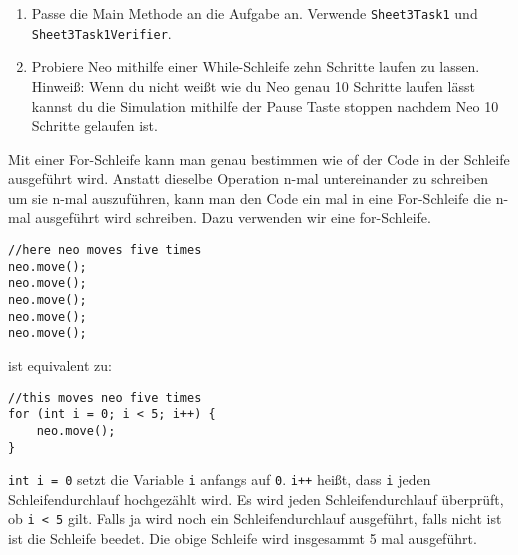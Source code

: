 
\begin{enumerate}
	\item Passe die Main Methode an die Aufgabe an. 
		Verwende \lstinline{Sheet3Task1} und \lstinline{Sheet3Task1Verifier}.
	\item
	Probiere Neo mithilfe einer While-Schleife zehn Schritte laufen zu lassen.\\
	Hinweiß: Wenn du nicht weißt wie du Neo genau 10 Schritte laufen lässt kannst du die Simulation mithilfe der Pause Taste stoppen nachdem Neo 10 Schritte gelaufen ist.
\end{enumerate}


\begin{Infobox}
	Mit einer For-Schleife kann man genau bestimmen wie of der Code in der Schleife ausgeführt wird.
	Anstatt dieselbe Operation n-mal untereinander zu schreiben um sie n-mal auszuführen, kann man den Code ein mal in eine For-Schleife die n-mal ausgeführt wird schreiben.
	Dazu verwenden wir eine for-Schleife. 

	\begin{lstlisting}
//here neo moves five times
neo.move();
neo.move();
neo.move();
neo.move();
neo.move();
	\end{lstlisting}
	
	ist equivalent zu:

	\begin{lstlisting}
//this moves neo five times
for (int i = 0; i < 5; i++) {
	neo.move();
}
	\end{lstlisting}

	\lstinline{int i = 0} setzt die Variable \lstinline{i} anfangs auf \lstinline{0}. 
	\lstinline{i++} heißt, dass \lstinline{i} jeden Schleifendurchlauf hochgezählt wird. 
	Es wird jeden Schleifendurchlauf überprüft, ob \lstinline{i < 5} gilt. 
	Falls ja wird noch ein Schleifendurchlauf ausgeführt, falls nicht ist ist die Schleife beedet. 
	Die obige Schleife wird insgesammt 5 mal ausgeführt.
\end{Infobox}


